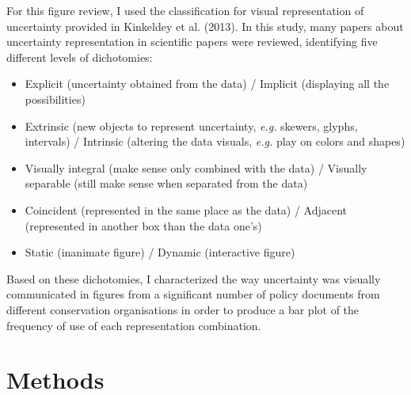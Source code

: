 \documentclass[12pt,a4paper]{article}
\begin{document}
For this figure review, I used the classification for visual representation of uncertainty provided in Kinkeldey et al. (2013).
In this study, many papers about uncertainty representation in scientific papers were reviewed, identifying five different levels of dichotomies:
\begin{itemize}
\item Explicit (uncertainty obtained from the data) / Implicit (displaying all the possibilities)
\item Extrinsic (new objects to represent uncertainty, \textit{e.g.} skewers, glyphs, intervals) / Intrinsic (altering the data visuals, \textit{e.g.} play on colors and shapes)
\item Visually integral (make sense only combined with the data) / Visually separable (still make sense when  separated from the data)
\item Coincident (represented in the same place as the data) / Adjacent (represented in another box than the data one's)
\item Static (inanimate figure) / Dynamic (interactive figure)
\end{itemize}
Based on these dichotomies, I characterized the way uncertainty was visually communicated in figures from a significant number of policy documents from different conservation organisations in order to produce a bar plot of the frequency of use of each representation combination.

\section{Methods}
\end{document}
